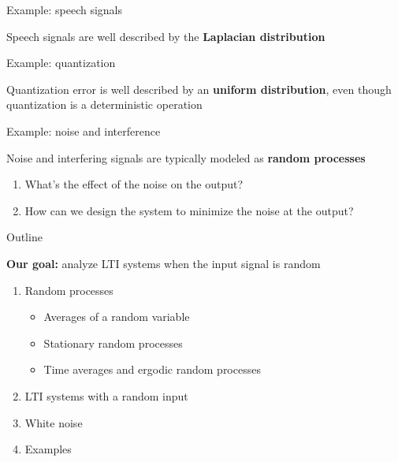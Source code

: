 \documentclass[10pt, aspectratio=169]{beamer}
\begin{document}
%
\begin{frame}{Example: speech signals}

Speech signals are well described by the \textbf{Laplacian distribution}

\begin{figure}
	\centering
	\resizebox{0.9\linewidth}{!}{}
	\label{fig:speech_and_dist}
\end{figure} 

\end{frame}


%
\begin{frame}{Example: quantization}

Quantization error is well described by an \textbf{uniform distribution}, even though quantization is a deterministic operation 

\begin{center}
	\resizebox{0.7\linewidth}{!}{}
\end{center}


\end{frame}

%
\begin{frame}{Example: noise and interference}

Noise and interfering signals are typically modeled as \textbf{random processes}

\begin{enumerate}
	\item What's the effect of the noise on the output? 
	\item How can we design the system to minimize the noise at the output?	
\end{enumerate}

\begin{figure}
	\centering
	\resizebox{0.7\linewidth}{!}{}
\end{figure} 
\end{frame}

\begin{frame}{Outline}

\textbf{Our goal:} analyze LTI systems when the input signal is random

\begin{enumerate}
	\item Random processes
	\begin{itemize}
		\item Averages of a random variable
		\item Stationary random processes
		\item Time averages and ergodic random processes
	\end{itemize}
	\item LTI systems with a random input
	\item White noise
	\item Examples
\end{enumerate}
\end{frame}
\end{document}
